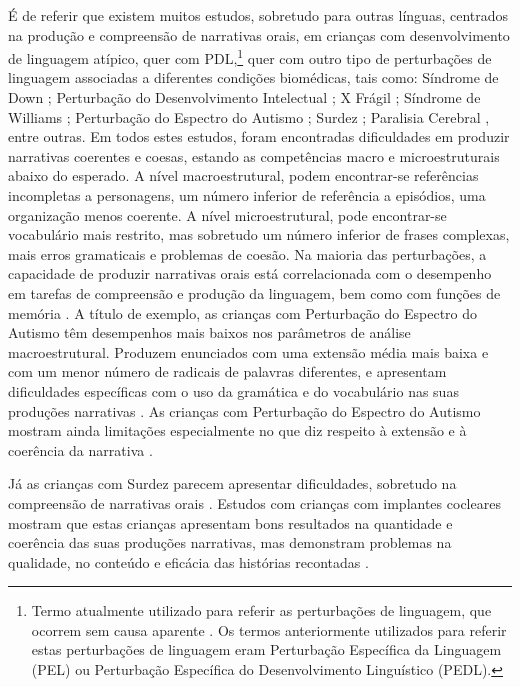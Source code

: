 \documentclass[output=paper,colorlinks,citecolor=brown,booklanguage=portuguese]{langscibook}
\begin{document}
É de referir que existem muitos estudos, sobretudo para outras línguas, centrados na produção e compreensão de narrativas orais, em crianças com desenvolvimento de linguagem atípico, quer com PDL,\footnote{Termo atualmente utilizado para referir as perturbações de linguagem, que ocorrem sem causa aparente \citep{Bishop2017b}. Os termos anteriormente utilizados para referir estas perturbações de linguagem eram Perturbação Específica da Linguagem (PEL) ou Perturbação Específica do Desenvolvimento Linguístico (PEDL).} quer com outro tipo de perturbações de linguagem associadas a diferentes condições biomédicas, tais como: Síndrome de Down \citep{Bysterveldt2012, Segal2015}; Perturbação do Desenvolvimento Intelectual \citep{Bunning2016}; X Frágil \citep{Estigarribia2011, Finestack2012}; Síndrome de Williams \citep{Marini2010}; Perturbação do Espectro do Autismo \citep{Rumpf2012, Gillam2015, Baixauli2016}; Surdez \citep{Crosson2001, Boons2013}; Paralisia Cerebral \citep{Nordberg2015}, entre outras. Em todos estes estudos, foram encontradas dificuldades em produzir narrativas coerentes e coesas, estando as competências macro e microestruturais abaixo do esperado. A nível macroestrutural, podem encontrar-se referências incompletas a personagens, um número inferior de referência a episódios, uma organização menos coerente. A nível microestrutural, pode encontrar-se vocabulário mais restrito, mas sobretudo um número inferior de frases complexas, mais erros gramaticais e problemas de coesão. Na maioria das perturbações, a capacidade de produzir narrativas orais está correlacionada com o desempenho em tarefas de compreensão e produção da linguagem, bem como com funções de memória \citep{Boudreau2008}.
A título de exemplo, as crianças com Perturbação do Espectro do Autismo têm desempenhos mais baixos nos parâmetros de análise macroestrutural. Produzem enunciados com uma extensão média mais baixa e com um menor número de radicais de palavras diferentes, e apresentam dificuldades específicas com o uso da gramática e do vocabulário nas suas produções narrativas \citep{King2013}. As crianças com Perturbação do Espectro do Autismo mostram ainda limitações especialmente no que diz respeito à extensão e à coerência da narrativa \citep{Rumpf2012}.

Já as crianças com Surdez parecem apresentar dificuldades, sobretudo na compreensão de narrativas orais \citep{Crosson2001}. Estudos com crianças com implantes cocleares mostram que estas crianças apresentam bons resultados na quantidade e coerência das suas produções narrativas, mas demonstram problemas na qualidade, no conteúdo e eficácia das histórias recontadas \citep{Boons2013}. 
\end{document}
